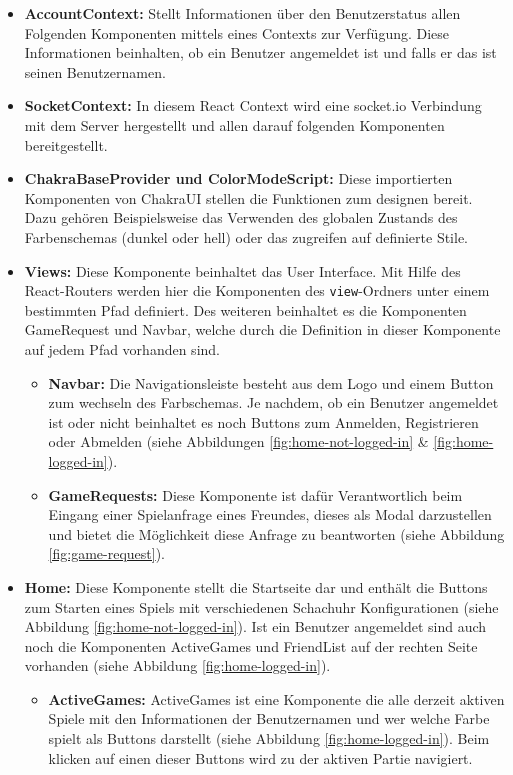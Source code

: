 \begin{itemize}
\item \textbf{AccountContext:} Stellt Informationen über den Benutzerstatus allen Folgenden Komponenten mittels eines Contexts zur Verfügung. Diese Informationen beinhalten, ob ein Benutzer angemeldet ist und falls er das ist seinen Benutzernamen.
\item \textbf{SocketContext:} In diesem React Context wird eine socket.io Verbindung mit dem Server hergestellt und allen darauf folgenden Komponenten bereitgestellt.
\item \textbf{ChakraBaseProvider und ColorModeScript:} Diese importierten Komponenten von ChakraUI stellen die Funktionen zum designen bereit. Dazu gehören Beispielsweise das Verwenden des globalen Zustands des Farbenschemas (dunkel oder hell) oder das zugreifen auf definierte Stile.
\item \textbf{Views:} Diese Komponente beinhaltet das User Interface. Mit Hilfe des React-Routers werden hier die Komponenten des \verb|view|-Ordners unter einem bestimmten Pfad definiert. Des weiteren beinhaltet es die Komponenten GameRequest und Navbar, welche durch die Definition in dieser Komponente auf jedem Pfad vorhanden sind.
\begin{itemize}
\item \textbf{Navbar:} Die Navigationsleiste besteht aus dem Logo und einem Button zum wechseln des Farbschemas. Je nachdem, ob ein Benutzer angemeldet ist oder nicht beinhaltet es noch Buttons zum Anmelden, Registrieren oder Abmelden (siehe Abbildungen \ref{fig:home-not-logged-in} \& \ref{fig:home-logged-in}).
\item \textbf{GameRequests:} Diese Komponente ist dafür Verantwortlich beim Eingang einer Spielanfrage eines Freundes, dieses als Modal darzustellen und bietet die Möglichkeit diese Anfrage zu beantworten (siehe Abbildung \ref{fig:game-request}).
\end{itemize}
\item \textbf{Home:} Diese Komponente stellt die Startseite dar und enthält die Buttons zum Starten eines Spiels mit verschiedenen Schachuhr Konfigurationen (siehe Abbildung \ref{fig:home-not-logged-in}). Ist ein Benutzer angemeldet sind auch noch die Komponenten ActiveGames und FriendList auf der rechten Seite vorhanden (siehe Abbildung \ref{fig:home-logged-in}).
\begin{itemize}
\item \textbf{ActiveGames:} ActiveGames ist eine Komponente die alle derzeit aktiven Spiele mit den Informationen der Benutzernamen und wer welche Farbe spielt als Buttons darstellt (siehe Abbildung \ref{fig:home-logged-in}). Beim klicken auf einen dieser Buttons wird zu der aktiven Partie navigiert.

\end{itemize}
\end{itemize}
